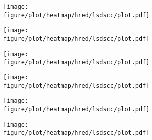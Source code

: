 \begin{figure}
    \centering
    \begin{subfigure}{0.33\linewidth}
        \centering
        \texttt{[image: figure/plot/heatmap/hred/lsdscc/plot.pdf]}
    \end{subfigure}%
    \begin{subfigure}{0.33\linewidth}
        \centering
        \texttt{[image: figure/plot/heatmap/hred/lsdscc/plot.pdf]}
    \end{subfigure}%
    \begin{subfigure}{0.33\linewidth}
        \centering
        \texttt{[image: figure/plot/heatmap/hred/lsdscc/plot.pdf]}
    \end{subfigure}
    \begin{subfigure}{0.33\linewidth}
        \centering
        \texttt{[image: figure/plot/heatmap/hred/lsdscc/plot.pdf]}
    \end{subfigure}%
    \begin{subfigure}{0.33\linewidth}
        \centering
        \texttt{[image: figure/plot/heatmap/hred/lsdscc/plot.pdf]}
    \end{subfigure}%
    \begin{subfigure}{0.33\linewidth}
        \centering
        \texttt{[image: figure/plot/heatmap/hred/lsdscc/plot.pdf]}
    \end{subfigure}%
    \caption{}
    \label{fig:corr_heatmap}
\end{figure}
